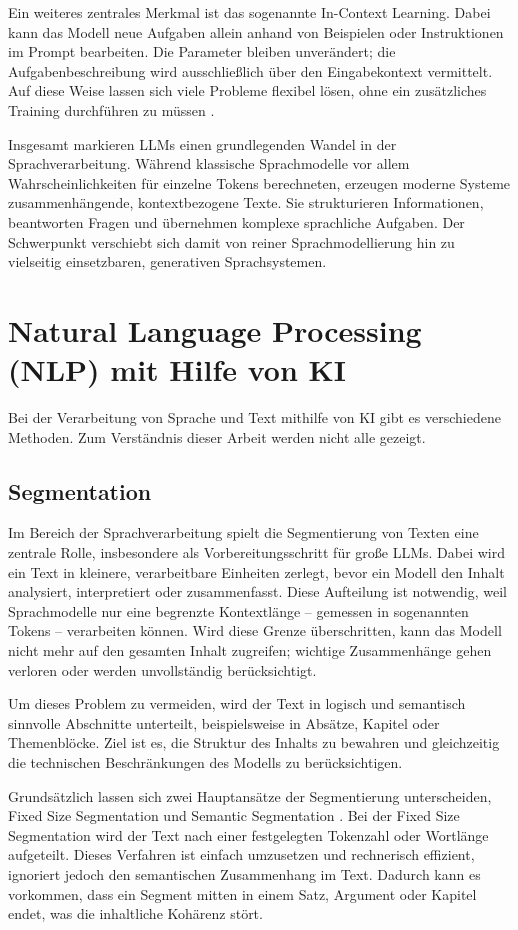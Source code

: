 Ein weiteres zentrales Merkmal ist das sogenannte In-Context Learning. Dabei kann das Modell neue Aufgaben allein anhand von Beispielen oder Instruktionen im Prompt bearbeiten. Die Parameter bleiben unverändert; die Aufgabenbeschreibung wird ausschließlich über den Eingabekontext vermittelt. Auf diese Weise lassen sich viele Probleme flexibel lösen, ohne ein zusätzliches Training durchführen zu müssen \cite{Min2022}.

Insgesamt markieren LLMs einen grundlegenden Wandel in der Sprachverarbeitung. Während klassische Sprachmodelle vor allem Wahrscheinlichkeiten für einzelne Tokens berechneten, erzeugen moderne Systeme zusammenhängende, kontextbezogene Texte. Sie strukturieren Informationen, beantworten Fragen und übernehmen komplexe sprachliche Aufgaben. Der Schwerpunkt verschiebt sich damit von reiner Sprachmodellierung hin zu vielseitig einsetzbaren, generativen Sprachsystemen.

\section{Natural Language Processing (NLP) mit Hilfe von KI}
Bei der Verarbeitung von Sprache und Text mithilfe von KI gibt es verschiedene Methoden. Zum Verständnis dieser Arbeit werden nicht alle gezeigt. 

\subsection{Segmentation}
Im Bereich der Sprachverarbeitung spielt die Segmentierung von Texten eine zentrale Rolle, insbesondere als Vorbereitungsschritt für große LLMs. Dabei wird ein Text in kleinere, verarbeitbare Einheiten zerlegt, bevor ein Modell den Inhalt analysiert, interpretiert oder zusammenfasst. Diese Aufteilung ist notwendig, weil Sprachmodelle nur eine begrenzte Kontextlänge – gemessen in sogenannten Tokens – verarbeiten können. Wird diese Grenze überschritten, kann das Modell nicht mehr auf den gesamten Inhalt zugreifen; wichtige Zusammenhänge gehen verloren oder werden unvollständig berücksichtigt.

Um dieses Problem zu vermeiden, wird der Text in logisch und semantisch sinnvolle Abschnitte unterteilt, beispielsweise in Absätze, Kapitel oder Themenblöcke. Ziel ist es, die Struktur des Inhalts zu bewahren und gleichzeitig die technischen Beschränkungen des Modells zu berücksichtigen. 

Grundsätzlich lassen sich zwei Hauptansätze der Segmentierung unterscheiden, Fixed Size Segmentation und Semantic Segmentation \cite{Ghinassi2024}. Bei der Fixed Size Segmentation wird der Text nach einer festgelegten Tokenzahl oder Wortlänge aufgeteilt. Dieses Verfahren ist einfach umzusetzen und rechnerisch effizient, ignoriert jedoch den semantischen Zusammenhang im Text. Dadurch kann es vorkommen, dass ein Segment mitten in einem Satz, Argument oder Kapitel endet, was die inhaltliche Kohärenz stört.

